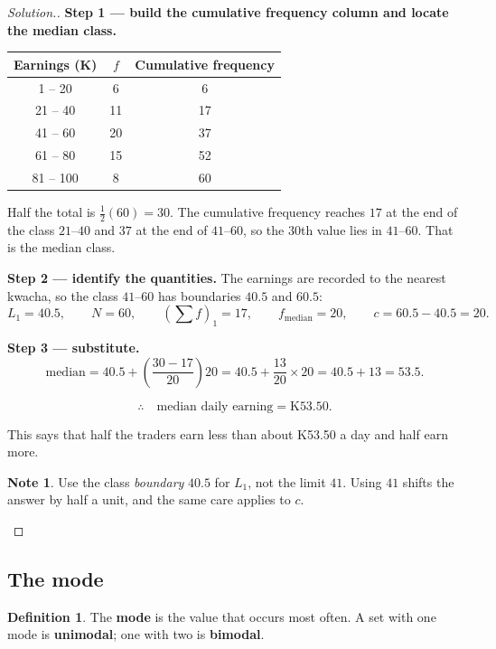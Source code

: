 \documentclass[11pt,a4paper]{article}
\theoremstyle{definition}
\newtheorem{definition}[thm]{Definition}
\newtheorem{note}[thm]{Note}
\newenvironment{solution}
  {\renewcommand{\qedsymbol}{}\begin{proof}[\textit{Solution}.]}
  {\end{proof}}
\begin{document}
\begin{solution}
\textbf{Step 1 --- build the cumulative frequency column and locate the median class.}

\begin{table}[H]
\centering
\begin{tabular}{|c|c|c|}
\hline
Earnings (K) & $f$ & Cumulative frequency\\
\hline
1 -- 20 & 6 & 6\\
21 -- 40 & 11 & 17\\
41 -- 60 & 20 & 37\\
61 -- 80 & 15 & 52\\
81 -- 100 & 8 & 60\\
\hline
\end{tabular}
\end{table}

Half the total is $\frac{1}{2}(60)=30$. The cumulative frequency reaches $17$ at the end
of the class $21$--$40$ and $37$ at the end of $41$--$60$, so the $30$th value lies in
$41$--$60$. That is the median class.

\textbf{Step 2 --- identify the quantities.} The earnings are recorded to the nearest
kwacha, so the class $41$--$60$ has boundaries $40.5$ and $60.5$:
$$L_1=40.5,\qquad N=60,\qquad \left(\sum f\right)_1=17,\qquad f_{\text{median}}=20,
\qquad c=60.5-40.5=20.$$

\textbf{Step 3 --- substitute.}
$$\text{median}=40.5+\left(\frac{30-17}{20}\right)20=40.5+\frac{13}{20}\times 20
=40.5+13=53.5.$$

$$\therefore\quad \text{median daily earning}=\text{K}53.50.$$

This says that half the traders earn less than about K53.50 a day and half earn more.

\begin{note}
Use the class \emph{boundary} $40.5$ for $L_1$, not the limit $41$. Using $41$ shifts
the answer by half a unit, and the same care applies to $c$.
\end{note}
\end{solution}

\subsection{The mode}

\begin{definition}
The \textbf{mode} is the value that occurs most often. A set with one mode is
\textbf{unimodal}; one with two is \textbf{bimodal}.
\end{definition}
\end{document}
